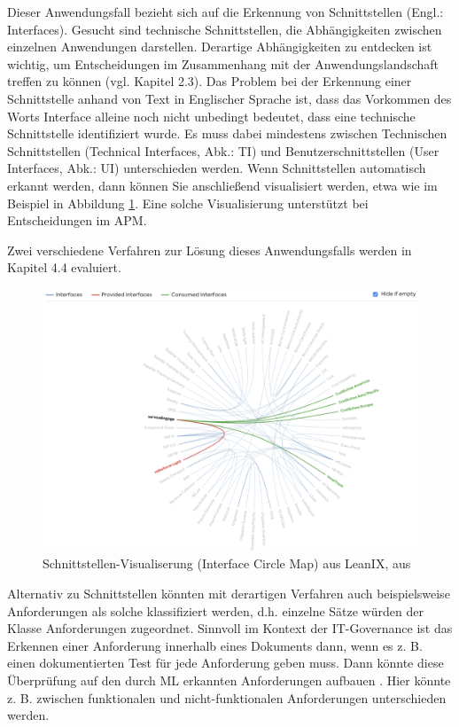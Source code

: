 Dieser Anwendungsfall bezieht sich auf die Erkennung von Schnittstellen (Engl.: Interfaces). Gesucht sind technische Schnittstellen, die Abhängigkeiten zwischen einzelnen Anwendungen darstellen. Derartige Abhängigkeiten zu entdecken ist wichtig, um Entscheidungen im Zusammenhang mit der Anwendungslandschaft treffen zu können (vgl. Kapitel 2.3). Das Problem bei der Erkennung einer Schnittstelle anhand von Text in Englischer Sprache ist, dass das Vorkommen des Worts Interface alleine noch nicht unbedingt bedeutet, dass eine technische Schnittstelle identifiziert wurde. Es muss dabei mindestens zwischen Technischen Schnittstellen (Technical Interfaces, Abk.: TI) und Benutzerschnittstellen (User Interfaces, Abk.: UI) unterschieden werden. Wenn Schnittstellen automatisch erkannt werden, dann können Sie anschließend visualisiert werden, etwa wie im Beispiel in Abbildung \ref{Abbildung:Interface_Circle}. Eine solche Visualisierung unterstützt bei Entscheidungen im APM. 

Zwei verschiedene Verfahren zur Lösung dieses Anwendungsfalls werden in Kapitel 4.4 evaluiert.

\begin{figure}[h]
\centering
\includegraphics[scale=0.35]{content/pics/Picture_10.png}
\caption{ Schnittstellen-Visualiserung (Interface Circle Map) aus LeanIX, aus \cite{leanix2} }
\label{Abbildung:Interface_Circle}
\end{figure}

Alternativ zu Schnittstellen könnten mit derartigen Verfahren auch beispielsweise Anforderungen als solche klassifiziert werden, d.h. einzelne Sätze würden der Klasse Anforderungen zugeordnet. Sinnvoll im Kontext der IT-Governance ist das Erkennen einer Anforderung innerhalb eines Dokuments dann, wenn es z. B. einen dokumentierten Test für jede Anforderung geben muss. Dann könnte diese Überprüfung auf den durch ML erkannten Anforderungen aufbauen \cite{Vogelsang}. Hier könnte z. B. zwischen funktionalen und nicht-funktionalen Anforderungen unterschieden werden. 

